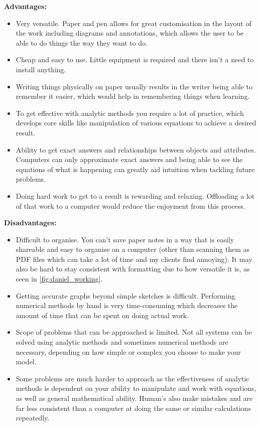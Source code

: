 \documentclass[11pt]{article}
\begin{document}
                \newpage
                \textbf{Advantages:}
                \begin{itemize}
                    \item Very versatile. Paper and pen allows for great customisation in the layout of the work including diagrams and annotations, which allows the user to be able to do things the way they want to do.
                    \item Cheap and easy to use. Little equipment is required and there isn't a need to install anything. 
                    \item Writing things physically on paper usually results in the writer being able to remember it easier, which would help in remembering things when learning. 
                    \item To get effective with analytic methods you require a lot of practice, which develops core skills like manipulation of various equations to achieve a desired result.
                    \item Ability to get exact answers and relationships between objects and attributes. Computers can only approximate exact answers and being able to see the equations of what is happening can greatly aid intuition when tackling future problems.
                    \item Doing hard work to get to a result is rewarding and relaxing. Offloading a lot of that work to a computer would reduce the enjoyment from this process.
                \end{itemize}

                \textbf{Disadvantages:}
                \begin{itemize}
                    \item Difficult to organise. You can't save paper notes in a way that is easily shareable and easy to organise on a computer (other than scanning them as PDF files which can take a lot of time and my clients find annoying). It may also be hard to stay consistent with formatting due to how versatile it is, as seen in \autoref{fig:daniel_working}.
                    \item Getting accurate graphs beyond simple sketches is difficult. Performing numerical methods by hand is very time-consuming which decreases the amount of time that can be spent on doing actual work. 
                    \item Scope of problems that can be approached is limited. Not all systems can be solved using analytic methods and sometimes numerical methods are necessary, depending on how simple or complex you choose to make your model.
                    \item Some problems are much harder to approach as the effectiveness of analytic methods is dependent on your ability to manipulate and work with equations, as well as general mathematical ability. Human's also make mistakes and are far less consistent than a computer at doing the same or similar calculations repeatedly.
                \end{itemize}
\end{document}
